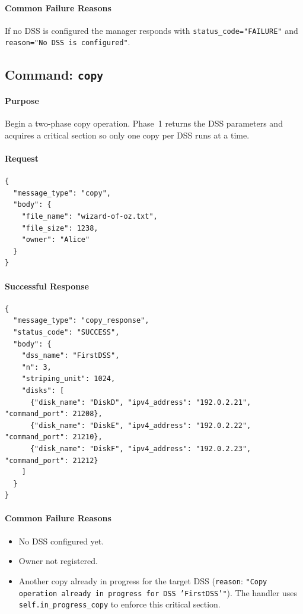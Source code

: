 \documentclass[11pt]{article}
\begin{document}
\paragraph{Common Failure Reasons} If no DSS is configured the manager responds with \texttt{status\_code="FAILURE"} and \texttt{reason="No DSS is configured"}.

\subsection{Command: \texttt{copy}}
\paragraph{Purpose} Begin a two-phase copy operation. Phase~1 returns the DSS parameters and acquires a critical section so only one copy per DSS runs at a time.

\paragraph{Request}
\begin{verbatim}
{
  "message_type": "copy",
  "body": {
    "file_name": "wizard-of-oz.txt",
    "file_size": 1238,
    "owner": "Alice"
  }
}
\end{verbatim}

\paragraph{Successful Response}
\begin{verbatim}
{
  "message_type": "copy_response",
  "status_code": "SUCCESS",
  "body": {
    "dss_name": "FirstDSS",
    "n": 3,
    "striping_unit": 1024,
    "disks": [
      {"disk_name": "DiskD", "ipv4_address": "192.0.2.21", "command_port": 21208},
      {"disk_name": "DiskE", "ipv4_address": "192.0.2.22", "command_port": 21210},
      {"disk_name": "DiskF", "ipv4_address": "192.0.2.23", "command_port": 21212}
    ]
  }
}
\end{verbatim}

\paragraph{Common Failure Reasons}
\begin{itemize}
  \item No DSS configured yet.
  \item Owner not registered.
  \item Another copy already in progress for the target DSS (\texttt{reason}: \texttt{"Copy operation already in progress for DSS 'FirstDSS'"}). The handler uses \texttt{self.in\_progress\_copy} to enforce this critical section.
\end{itemize}
\end{document}
